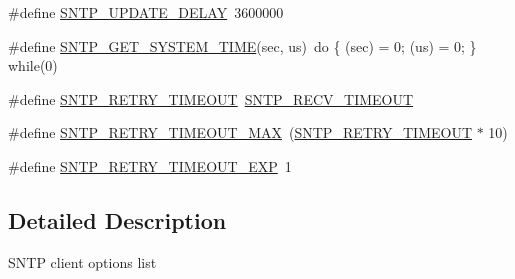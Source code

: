\begin{DoxyCompactItemize}
\item 
\#define \hyperlink{group__sntp__opts_ga9232c56443115be05a2f852eba21979c}{S\+N\+T\+P\+\_\+\+U\+P\+D\+A\+T\+E\+\_\+\+D\+E\+L\+AY}~3600000
\item 
\#define \hyperlink{group__sntp__opts_gab0ea385479a5c5c8c173f165ded2fb63}{S\+N\+T\+P\+\_\+\+G\+E\+T\+\_\+\+S\+Y\+S\+T\+E\+M\+\_\+\+T\+I\+ME}(sec,  us)~do \{ (sec) = 0; (us) = 0; \} while(0)
\item 
\#define \hyperlink{group__sntp__opts_ga86d651d8eb07687208308deef95a23ba}{S\+N\+T\+P\+\_\+\+R\+E\+T\+R\+Y\+\_\+\+T\+I\+M\+E\+O\+UT}~\hyperlink{group__sntp__opts_ga44cf26b9b19832d88599244711a12d08}{S\+N\+T\+P\+\_\+\+R\+E\+C\+V\+\_\+\+T\+I\+M\+E\+O\+UT}
\item 
\#define \hyperlink{group__sntp__opts_gafde10b3ed7cb4bb2cd2c4daa389db699}{S\+N\+T\+P\+\_\+\+R\+E\+T\+R\+Y\+\_\+\+T\+I\+M\+E\+O\+U\+T\+\_\+\+M\+AX}~(\hyperlink{group__sntp__opts_ga86d651d8eb07687208308deef95a23ba}{S\+N\+T\+P\+\_\+\+R\+E\+T\+R\+Y\+\_\+\+T\+I\+M\+E\+O\+UT} $\ast$ 10)
\item 
\#define \hyperlink{group__sntp__opts_gafdb7e98f608cc429188d7dac356614c2}{S\+N\+T\+P\+\_\+\+R\+E\+T\+R\+Y\+\_\+\+T\+I\+M\+E\+O\+U\+T\+\_\+\+E\+XP}~1
\end{DoxyCompactItemize}


\subsection{Detailed Description}
S\+N\+TP client options list 